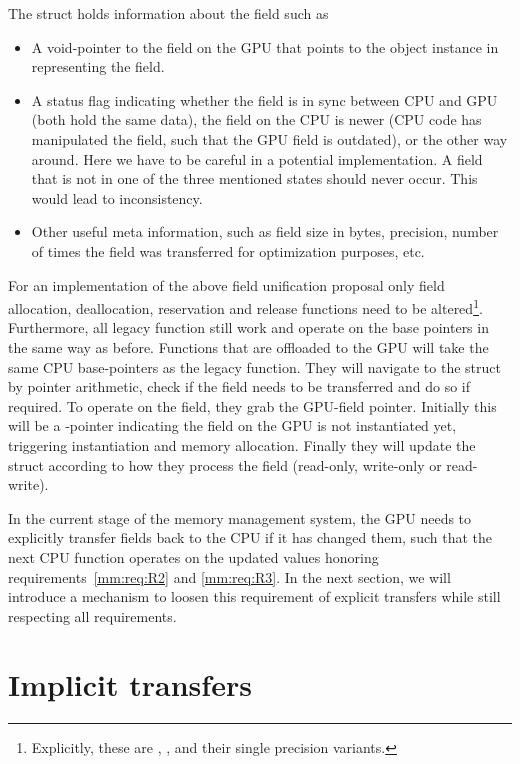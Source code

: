 The  struct holds information about the field such as
\begin{itemize}
	\item A void-pointer to the field on the GPU that points to the object instance in \quda representing the field.
	\item A status flag indicating whether the field is in sync between CPU and GPU (both hold the same data), the field on the CPU is newer (CPU code has manipulated the field, such that the GPU field is outdated), or the other way around. Here we have to be careful in a potential implementation. A field that is not in one of the three mentioned states should never occur. This would lead to inconsistency.
	\item Other useful meta information, such as field size in bytes, precision, number of times the field was transferred for optimization purposes, etc.
\end{itemize}
For an implementation of the above field unification proposal only field allocation, deallocation, reservation and release functions need to be altered\footnote{Explicitly, these are , ,  and their single precision variants.}.
Furthermore, all legacy \openqxd function still work and operate on the base pointers in the same way as before.
Functions that are offloaded to the GPU will take the same CPU base-pointers as the legacy function.
They will navigate to the  struct by pointer arithmetic, check if the field needs to be transferred and do so if required.
To operate on the field, they grab the GPU-field pointer.
Initially this will be a \NULL-pointer indicating the field on the GPU is not instantiated yet, triggering instantiation and memory allocation.
Finally they will update the  struct according to how they process the field (read-only, write-only or read-write).

In the current stage of the memory management system, the GPU needs to explicitly transfer fields back to the CPU if it has changed them, such that the next CPU function operates on the updated values honoring requirements~\ref{mm:req:R2} and \ref{mm:req:R3}.
In the next section, we will introduce a mechanism to loosen this requirement of explicit transfers while still respecting all requirements.

\section{Implicit transfers}
\label{sec:mm:implicit:transfers}

